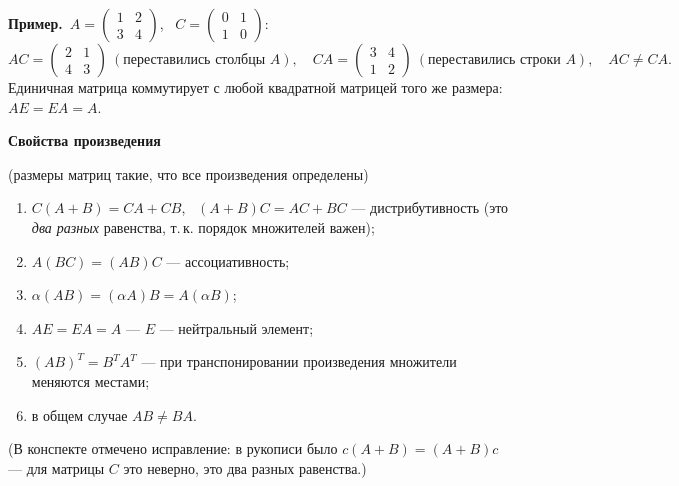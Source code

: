 \documentclass[a4paper,11pt]{article}
\newcommand{\prim}{\par\smallskip\noindent\textbf{\textcolor{teoc!80!black}{Пример.}}\ }
\newcommand{\podr}[1]{\par\needspace{8\baselineskip}\medskip
  {\large\bfseries\textcolor{oprc!80!black}{#1}}\par\nopagebreak\smallskip}
\begin{document}
\prim $A = \begin{pmatrix} 1 & 2 \\ 3 & 4 \end{pmatrix}$, \ $C = \begin{pmatrix} 0 & 1 \\ 1 & 0 \end{pmatrix}$:
\[
  AC = \begin{pmatrix} 2 & 1 \\ 4 & 3 \end{pmatrix} \ (\text{переставились столбцы } A), \quad
  CA = \begin{pmatrix} 3 & 4 \\ 1 & 2 \end{pmatrix} \ (\text{переставились строки } A), \quad AC \ne CA.
\]
Единичная матрица коммутирует с любой квадратной матрицей того же размера: $AE = EA = A$.

\podr{Свойства произведения}

\begin{teo}
(размеры матриц такие, что все произведения определены)
\begin{enumerate}[leftmargin=*]
  \item $C(A + B) = CA + CB$, \ $(A + B)C = AC + BC$ --- дистрибутивность (это \emph{два разных} равенства, т.\,к. порядок множителей важен);
  \item $A(BC) = (AB)C$ --- ассоциативность;
  \item $\alpha(AB) = (\alpha A)B = A(\alpha B)$;
  \item $AE = EA = A$ --- $E$ --- нейтральный элемент;
  \item $(AB)^T = B^T A^T$ --- при транспонировании произведения множители меняются местами;
  \item в общем случае $AB \ne BA$.
\end{enumerate}
\end{teo}

{\small\textcolor{zamc}{(В конспекте отмечено исправление: в рукописи было $c(A + B) = (A + B)c$ --- для матрицы $C$ это неверно,
это два разных равенства.)}}
\end{document}
